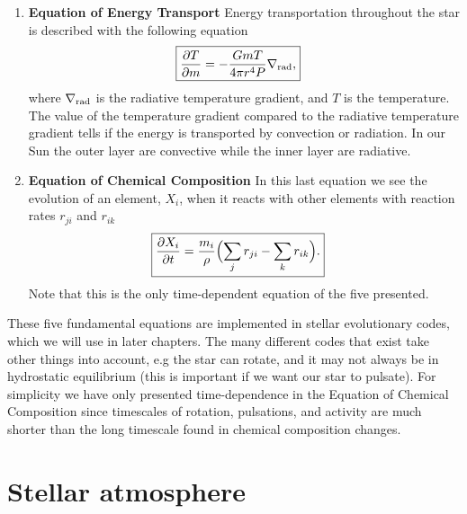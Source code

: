 \begin{enumerate}
    \item \textbf{Equation of Energy Transport}
        \nicebreak
        Energy transportation throughout the star is described with the
        following equation
        \begin{align}
            \Aboxed{\pd{T}{m} &= -\frac{GmT}{4\pi r^4P}\nabla_\tm{rad},}
        \end{align}
        where $\nabla_{\textnormal{rad}}$ is the radiative temperature gradient, and $T$
        is the temperature. The value of the temperature gradient compared to
        the radiative temperature gradient tells if the energy is transported by
        convection or radiation. In our Sun the outer layer are convective while
        the inner layer are radiative.

    \item \textbf{Equation of Chemical Composition}
        \nicebreak
        In this last equation we see the evolution of an element, $X_i$, when
        it reacts with other elements with reaction rates $r_{ji}$ and $r_{ik}$
        \begin{align}
            \Aboxed{\pd{X_i}{t} &= \frac{m_i}{\rho} \Bigl( \sum_j r_{ji} - \sum_k r_{ik}\Bigr).}
        \end{align}
        Note that this is the only time-dependent equation of the five
        presented.
\end{enumerate}

These five fundamental equations are implemented in stellar evolutionary codes,
which we will use in later chapters. The many different codes that exist take
other things into account, e.g the star can rotate, and it may not always be in
hydrostatic equilibrium (this is important if we want our star to pulsate). For
simplicity we have only presented time-dependence in the Equation of Chemical
Composition since timescales of rotation, pulsations, and activity are much
shorter than the long timescale found in chemical composition changes.


\section{Stellar atmosphere}
